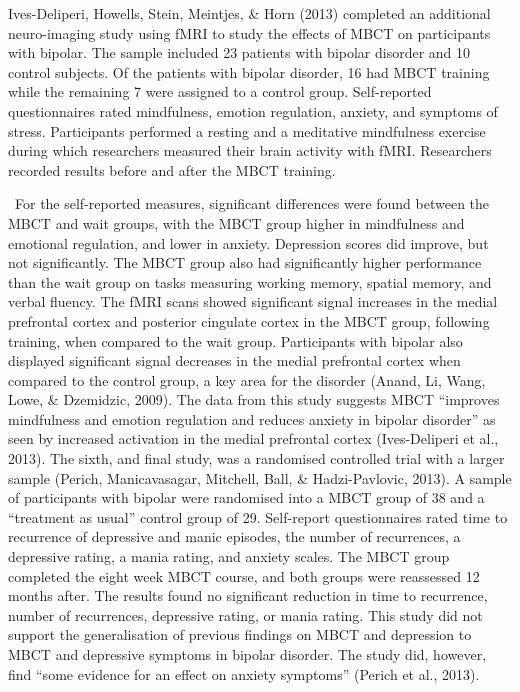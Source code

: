 Ives-Deliperi, Howells, Stein, Meintjes, & Horn (2013) completed an additional neuro-imaging study using fMRI to study the effects of MBCT on participants with bipolar. The sample included 23 patients with bipolar disorder and 10 control subjects. Of the patients with bipolar disorder, 16 had MBCT training while the remaining 7 were assigned to a control group. Self-reported questionnaires rated mindfulness, emotion regulation, anxiety, and symptoms of stress. Participants performed a resting and a meditative mindfulness exercise during which researchers measured their brain activity with fMRI. Researchers recorded results before and after the MBCT training.

 For the self-reported measures, significant differences were found between the MBCT and wait groups, with the MBCT group higher in mindfulness and emotional regulation, and lower in anxiety. Depression scores did improve, but not significantly. The MBCT group also had significantly higher performance than the wait group on tasks measuring working memory, spatial memory, and verbal fluency. The fMRI scans showed significant signal increases in the medial prefrontal cortex and posterior cingulate cortex in the MBCT group, following training, when compared to the wait group. Participants with bipolar also displayed significant signal decreases in the medial prefrontal cortex when compared to the control group, a key area for the disorder (Anand, Li, Wang, Lowe, & Dzemidzic, 2009). The data from this study suggests MBCT “improves mindfulness and emotion regulation and reduces anxiety in bipolar disorder” as seen by increased activation in the medial prefrontal cortex (Ives-Deliperi et al., 2013).
The sixth, and final study, was a randomised controlled trial with a larger sample (Perich, Manicavasagar, Mitchell, Ball, & Hadzi-Pavlovic, 2013). A sample of participants with bipolar were randomised into a MBCT group of 38 and a “treatment as usual” control group of 29. Self-report questionnaires rated time to recurrence of depressive and manic episodes, the number of recurrences, a depressive rating, a mania rating, and anxiety scales. The MBCT group completed the eight week MBCT course, and both groups were reassessed 12 months after. The results found no significant reduction in time to recurrence, number of recurrences, depressive rating, or mania rating. This study did not support the generalisation of previous findings on MBCT and depression to MBCT and depressive symptoms in bipolar disorder. The study did, however, find “some evidence for an effect on anxiety symptoms” (Perich et al., 2013). 

